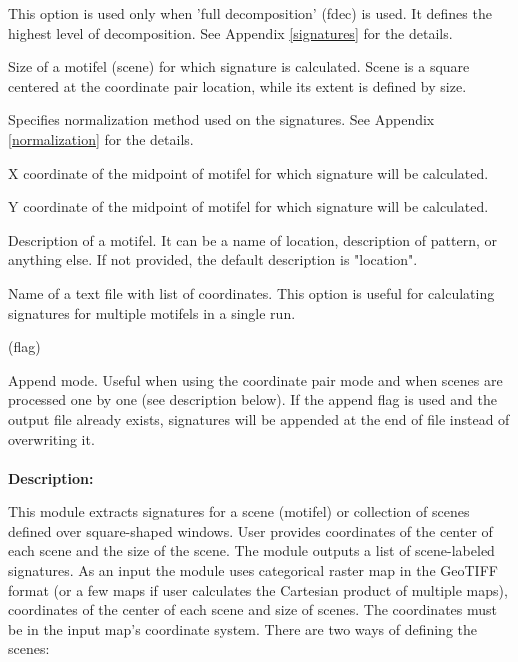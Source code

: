 
This option is used only when 'full decomposition' (fdec) is used.
It defines the highest level of decomposition.
See Appendix \ref{signatures} for the details.


Size of a motifel (scene) for which signature is calculated.
Scene is a square centered at the coordinate pair location, while its extent is defined by size. 


Specifies normalization method used on the signatures. 
See Appendix \ref{normalization} for the details.


X coordinate of the midpoint of motifel for which signature will be calculated.


Y coordinate of the midpoint of motifel for which signature will be calculated.


Description of a motifel.
It can be a name of location, description of pattern, or anything else. 
If not provided, the default description is "location".


Name of a text file with list of coordinates. 
This option is useful for calculating signatures for multiple motifels in a single run. 

 (flag)

Append mode. 
Useful when using the coordinate pair mode and when scenes are processed one by one (see description below). 
If the append flag is used and the output file already exists, signatures will be appended at the end of file instead of overwriting it.
\\\\
{\bf Description:}

This module extracts signatures for a scene (motifel) or collection of scenes defined over square-shaped windows.
User provides coordinates of the center of each scene and the size of the scene. 
The module outputs a list of scene-labeled signatures.
As an input the module uses categorical raster map in the GeoTIFF format (or a few maps if user calculates the Cartesian product of multiple maps), coordinates of the center of each scene and size of scenes. 
The coordinates must be in the input map's coordinate system. 
There are two ways of defining the scenes:

